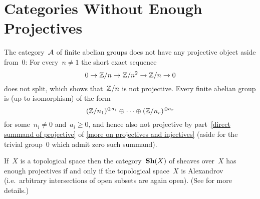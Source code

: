 \section{Categories Without Enough Projectives}


\begin{example}
  The category~$\mathcal{A}$ of finite abelian groups does not have any projective object aside from~$0$:
  For every~$n \neq 1$ the short exact sequence
  \[
    0
    \to
    \mathbb{Z}/n
    \to
    \mathbb{Z}/n^2
    \to
    \mathbb{Z}/n
    \to
    0
  \]
  does not split, which shows that~$\mathbb{Z}/n$ is not projective.
  Every finite abelian group is (up to isomorphism) of the form
  \[
      (\mathbb{Z}/n_1)^{\oplus a_1}
      \oplus
      \dotsb
      \oplus
      (\mathbb{Z}/n_r)^{\oplus a_r}
  \]
  for some~$n_i \neq 0$ and~$a_i \geq 0$, and hence also not projective by part~\ref*{direct summand of projective} of \cref{more on projectives and injectives} (aside for the trivial group~$0$ which admit zero such summand).
\end{example}





\begin{example}
  If~$X$ is a topological space then the category~$\mathbf{Sh}(X)$ of sheaves over~$X$ has enough projectives if and only if the topological space~$X$ is Alexandrov (i.e.\ arbitrary intersections of open subsets are again open).
  (See \cite{shXenoughprojectives} for more details.)
\end{example}




